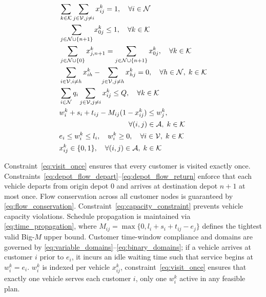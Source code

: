 \documentclass{ieeeaccess}
\newcommand{\DIFaddhl}[1]{\bgroup\markoverwith{\textcolor{yellow}{\rule[-.6ex]{2pt}{2.6ex}}}\ULon{#1}} %
\newcommand{\DIFaddmath}[1]{{\color{blue}#1}} %
\providecommand{\DIFaddbegin}{} %
\providecommand{\DIFaddend}{} %
\DeclareRobustCommand{\DIFadd}[1]{\ifmmode\expandafter\DIFaddmath\else\expandafter\DIFaddhl\fi{#1}} %
\begin{document}
\begin{align}
  &\sum_{k \in \mathcal{K}} \sum_{j \in \mathcal{V}, j \neq i} x_{ij}^k = 1, \quad \forall i \in \mathcal{N} \label{eq:visit_once} \\
  &\sum_{j \in \mathcal{N} \cup \{n+1\}} x_{0j}^k \le 1, \quad \forall k \in \mathcal{K} \label{eq:depot_flow_depart} \\
  &\sum_{j \in \mathcal{N} \cup \{0\}} x_{j, n+1}^k = \sum_{j \in \mathcal{N} \cup \{n+1\}} x_{0j}^k, \quad \forall k \in \mathcal{K} \label{eq:depot_flow_return} \\
  &\sum_{i \in \mathcal{V}, i \neq h} x_{ih}^k - \sum_{j \in \mathcal{V}, j \neq h} x_{hj}^k = 0, \quad \forall h \in \mathcal{N}, \; k \in \mathcal{K} \label{eq:flow_conservation} \\
  &\sum_{i \in \mathcal{N}} q_i \sum_{j \in \mathcal{V}, j \neq i} x_{ij}^k \le Q, \quad \forall k \in \mathcal{K} \label{eq:capacity_constraint} \\
  &w_i^k + s_i + t_{ij} - M_{ij} (1 - x_{ij}^k) \le w_j^k, \nonumber \\
  &\hspace{3.4cm} \forall (i, j) \in \mathcal{A}, \; k \in \mathcal{K} \label{eq:time_propagation} \\
  &e_i \le w_i^k \le l_i, \quad w_i^k \ge 0, \quad \forall i \in \mathcal{V}, \; k \in \mathcal{K} \label{eq:variable_domains} \\
  &x_{ij}^k \in \{0, 1\}, \quad \forall (i, j) \in \mathcal{A}, \; k \in \mathcal{K} \label{eq:binary_domains}
\end{align}

Constraint~\eqref{eq:visit_once} ensures that every customer is visited exactly once. Constraints~\eqref{eq:depot_flow_depart}--\eqref{eq:depot_flow_return} enforce that each vehicle departs from origin depot $0$ and arrives at destination depot $n+1$ at most once. Flow conservation across all customer nodes is guaranteed by \eqref{eq:flow_conservation}. Constraint~\eqref{eq:capacity_constraint} prevents vehicle capacity violations. Schedule propagation is maintained via \eqref{eq:time_propagation}, where $M_{ij} = \max\{0, l_i + s_i + t_{ij} - e_j\}$ defines the tightest valid Big-$M$ upper bound. Customer time-window compliance and domains are governed by \eqref{eq:variable_domains}--\eqref{eq:binary_domains}; if a vehicle arrives at customer $i$ prior to $e_i$, it incurs an idle waiting time such that service begins at $w_i^k = e_i$.  \DIFaddbegin \DIFadd{Although }\DIFaddend $w_i^k$ is indexed per vehicle  \DIFaddbegin \DIFadd{to match }\DIFaddend $x_{ij}^k$, constraint~\eqref{eq:visit_once} ensures that exactly one vehicle serves each customer $i$,  \DIFaddbegin \DIFadd{so }\DIFaddend only one $w_i^k$ \DIFaddbegin \DIFadd{is }\DIFaddend active in any feasible  plan.
\end{document}

